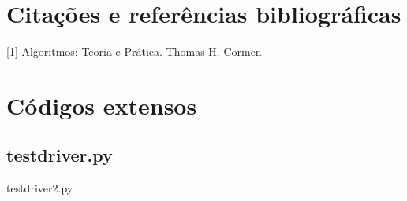 \documentclass[12pt,a4paper,twoside]{report}
\begin{document}
\chapter{Citações e referências bibliográficas}
[1] Algoritmos: Teoria e Prática. Thomas H. Cormen
		\date{Today}







\clearpage
{}
\appendix

\chapter{Códigos extensos \label{ap:testdriver}}
\section{testdriver.py}
 {testdriver2.py}
\end{document}
